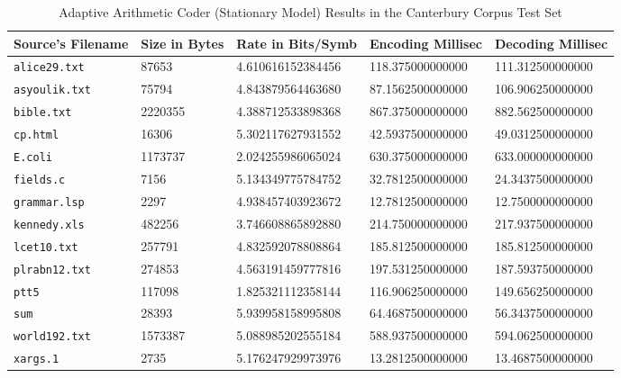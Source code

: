 \documentclass[a4paper, twocolumn]{article}
\begin{document}
    \begin{table*}[t]
        \centering
        \begin{tabular}{lllll}
        \toprule
            Source's Filename & Size in Bytes & Rate in Bits/Symb & Encoding Millisec & Decoding Millisec \\
        \midrule
            \texttt{alice29.txt}  &   87653 & 4.610616152384456 & 118.375000000000 & 111.312500000000 \\
            \texttt{asyoulik.txt} &   75794 & 4.843879564463680 & 87.1562500000000 & 106.906250000000 \\
            \texttt{bible.txt}    & 2220355 & 4.388712533898368 & 867.375000000000 & 882.562500000000 \\
            \texttt{cp.html}      &   16306 & 5.302117627931552 & 42.5937500000000 & 49.0312500000000 \\
            \texttt{E.coli}       & 1173737 & 2.024255986065024 & 630.375000000000 & 633.000000000000 \\
            \texttt{fields.c}     &    7156 & 5.134349775784752 & 32.7812500000000 & 24.3437500000000 \\
            \texttt{grammar.lsp}  &    2297 & 4.938457403923672 & 12.7812500000000 & 12.7500000000000 \\
            \texttt{kennedy.xls}  &  482256 & 3.746608865892880 & 214.750000000000 & 217.937500000000 \\
            \texttt{lcet10.txt}   &  257791 & 4.832592078808864 & 185.812500000000 & 185.812500000000 \\
            \texttt{plrabn12.txt} &  274853 & 4.563191459777816 & 197.531250000000 & 187.593750000000 \\
            \texttt{ptt5}         &  117098 & 1.825321112358144 & 116.906250000000 & 149.656250000000 \\
            \texttt{sum}          &   28393 & 5.939958158995808 & 64.4687500000000 & 56.3437500000000 \\
            \texttt{world192.txt} & 1573387 & 5.088985202555184 & 588.937500000000 & 594.062500000000 \\
            \texttt{xargs.1}      &    2735 & 5.176247929973976 & 13.2812500000000 & 13.4687500000000 \\
        \bottomrule
        \end{tabular}
        \caption{Adaptive Arithmetic Coder (Stationary Model) Results in the Canterbury Corpus Test Set}
        \label{tab:aac}
    \end{table*}
\end{document}
